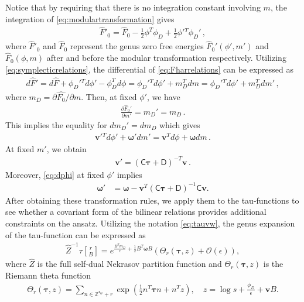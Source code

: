 \documentclass[11pt, a4paper]{article}
\newcommand{\tauftn}[2]{\tau\genfrac[]{0pt}{1}{#1}{#2}}
\theoremstyle{definition}
\begin{document}
Notice that by requiring that there is no integration constant involving $m$, the integration of \eqref{eq:modulartransformation} gives \cite[eq. (9)]{deWit:1996gjy}
\begin{align}\label{eq:Fharrelations}
    \hat F'_0=\hat F_0-\frac{1}{2}\phi^T \phi_{D}+\frac{1}{2}\phi'{}^T\phi_{D}' \, ,
\end{align}
where $\hat F'_0$ and $\hat F_0$ represent the genus zero free energies $\hat F_0'(\phi',m')$ and $\hat F_0(\phi,m)$ after and before the modular transformation respectively. Utilizing \eqref{eq:symplecticrelations}, the differential of \eqref{eq:Fharrelations} can be expressed as
\begin{align}
    d\hat F'=d\hat F+\phi_D'{}^Td\phi'-\phi_D^Td\phi=\phi_D'{}^Td\phi'+m_D^T dm=\phi_D'{}^Td\phi'+m_D^T dm' \, ,
\end{align}
where $m_D=\partial \hat{F_0}/\partial m$. Then, at fixed $\phi'$, we have
\begin{align}
    \frac{\partial \hat{F}_0'}{\partial m'}=m_D'=m_D \, .
\end{align}
This implies the equality for $dm_D'=dm_D$ which gives
\begin{align}
    \boldsymbol v'{}^Td\phi'+\boldsymbol\omega'dm'=\boldsymbol v^Td\phi+\boldsymbol\omega dm \, .
\end{align}
At fixed $m'$, we obtain
\begin{align}
    \boldsymbol v'=(\mathsf{C}\boldsymbol\tau+\mathsf{D})^{-T}\boldsymbol v \, .
\end{align}
Moreover, \eqref{eq:dphi} at fixed $ \phi' $ implies
\begin{align}
    \boldsymbol\omega' &=\boldsymbol\omega- \boldsymbol v^T(\mathsf{C}\boldsymbol\tau+\mathsf{D})^{-1}\mathsf{C}\boldsymbol v.
\end{align}
After obtaining these transformation rules, we apply them to the tau-functions to see whether a covariant form of the bilinear relations provides additional constraints on the ansatz. Utilizing the notation \eqref{eq:tauvw}, the genus expansion of the tau-function can be expressed as
\begin{align}\label{eq:Zinvstau}
    \hat Z^{-1}\tauftn{r}{B}=e^{\frac{B^Tm_D}{\epsilon}+\frac{1}{2}B^T\boldsymbol\omega B}
    \left(\Theta_r(\boldsymbol\tau,z)+\mathcal{O}(\epsilon)\right),
\end{align}
where $\hat{Z}$ is the full self-dual Nekrasov partition function and $\Theta_r(\boldsymbol\tau,z)$ is the Riemann theta function
\begin{align}
    \Theta_r(\boldsymbol\tau,z)
    =
    \sum_{n\in\mathbb{Z}^{\mathfrak{r}_G}+r}
    \exp\left(
        \frac{1}{2}n^T\boldsymbol\tau n+n^Tz
    \right), \quad z=\log s+\frac{\phi_D}{\epsilon}+ \boldsymbol vB.
\end{align}
\end{document}
